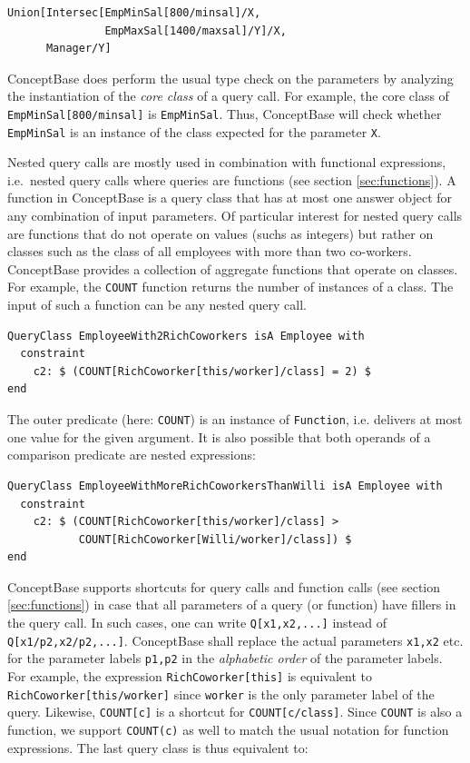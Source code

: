 {\small
\begin{verbatim}
Union[Intersec[EmpMinSal[800/minsal]/X,
               EmpMaxSal[1400/maxsal]/Y]/X,
      Manager/Y]
\end{verbatim}
}

ConceptBase does perform the usual type check on the parameters by analyzing
the instantiation of the {\em core class\/} of a query call. For example, the core class
of {\tt EmpMinSal[800/minsal]} is {\tt EmpMinSal}. Thus, ConceptBase will
check whether {\tt EmpMinSal} is an instance of the class expected for the
parameter {\tt X}.

Nested query calls are mostly used in combination with functional expressions, i.e.\
nested query calls where queries are functions (see section \ref{sec:functions}).
A function in ConceptBase is a query class that has at most one answer object
for any combination of input parameters.
Of particular interest for nested query calls are functions that do not
operate on values (suchs as integers) but rather on classes such as the class of all
employees with more than two co-workers. ConceptBase provides a collection
of aggregate functions that operate on classes. For example, the {\tt COUNT}
function returns the number of instances of a class. The input of such a function
can be any nested query call.

{\small
\begin{verbatim}
QueryClass EmployeeWith2RichCoworkers isA Employee with
  constraint
    c2: $ (COUNT[RichCoworker[this/worker]/class] = 2) $
end
\end{verbatim}
}

The outer predicate
(here: {\tt COUNT}) is an instance of {\tt Function}, i.e. delivers
at most one value for the given argument. It is also possible that
both operands of a comparison predicate are nested expressions:

{\small
\begin{verbatim}
QueryClass EmployeeWithMoreRichCoworkersThanWilli isA Employee with
  constraint
    c2: $ (COUNT[RichCoworker[this/worker]/class] >
           COUNT[RichCoworker[Willi/worker]/class]) $
end
\end{verbatim}
}

ConceptBase supports shortcuts for query calls and function calls
(see section \ref{sec:functions}) in case that
all parameters of a query (or function) have fillers in the query call. In such cases,
one can write {\tt Q[x1,x2,...]} instead of {\tt Q[x1/p2,x2/p2,...]}. ConceptBase shall
replace the actual parameters {\tt x1,x2} etc. for the parameter labels {\tt p1,p2}
in the {\em alphabetic order\/} of the parameter labels. For example, the expression 
{\tt RichCoworker[this]} is equivalent to {\tt RichCoworker[this/worker]} since
{\tt worker} is the only parameter label of the query. Likewise, 
{\tt COUNT[c]} is a shortcut for {\tt COUNT[c/class]}. Since {\tt COUNT} is also
a function, we support {\tt COUNT(c)} as well to match the usual notation for function
expressions. The last query class is thus equivalent to:

